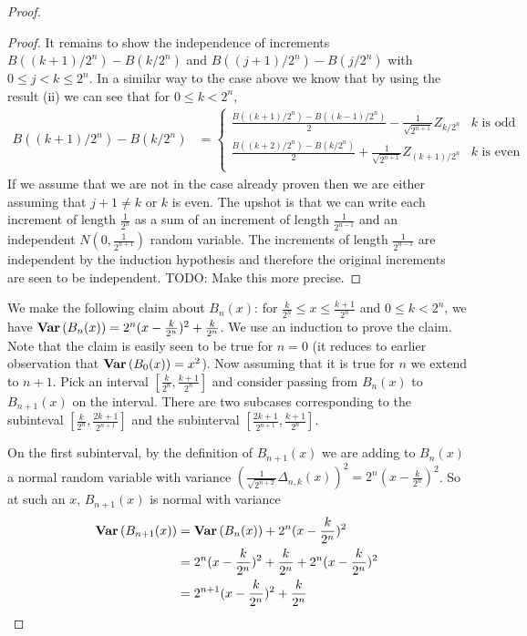 \begin{proof}
\begin{proof}
It remains to show the independence of increments 
$B((k+1)/2^n) - B(k/2^n)$ and $B((j+1)/2^n) - B(j/2^n)$ with $0 \leq j
< k \leq 2^n$.  In a similar way to the case above we know that
by using the result (ii) we can see that for $0 \leq k < 2^n$,
\begin{align*}
B((k+1)/2^n) - B(k/2^n) &= \begin{cases}
\frac{B((k+1)/2^n) - B((k-1)/2^n)}{2} - \frac{1}{\sqrt{2^{n+1}}}
Z_{k/2^n} & \text{$k$ is odd} \\
\frac{B((k+2)/2^n) - B(k/2^n)}{2} + \frac{1}{\sqrt{2^{n+1}}}
Z_{(k+1)/2^n} & \text{$k$ is even} \\
\end{cases}
\end{align*}
If we assume that we are not in the case already proven then we are either
assuming that $j+1 \neq k$ or $k$ is even. The upshot is that we can
write each increment of length $\frac{1}{2^n}$ as a sum of an increment of
length $\frac{1}{2^{n-1}}$ and an independent $N(0, \frac{1}{2^{n+1}})$
 random variable.  The increments of length $\frac{1}{2^{n-1}}$ are
 independent by the induction hypothesis and therefore the original
 increments are seen to be independent.  TODO: Make this more precise.
\end{proof}

We make the following claim about $B_n(x)$: for $\frac{k}{2^n}
\leq x \leq \frac{k+1}{2^n}$ and $0 \leq k < 2^n$, we have
$\textbf{Var} \left (B_n(x) \right ) = 2^n(x - \frac{k}{2^n})^2 + \frac{k}{2^n}$.  We
use an induction to prove the claim.  Note
that the claim is easily seen to be true for $n=0$ (it reduces to
earlier observation that $\textbf{Var} \left (B_0(x) \right ) = x^2$).  Now assuming that
it is true for $n$ we extend to $n+1$.  Pick an interval
$[\frac{k}{2^{n}}, \frac{k+1}{2^{n}}]$ and consider passing from
$B_n(x)$ to $B_{n+1}(x)$ on the interval.  There are two subcases
corresponding to the subinteval $[\frac{k}{2^{n}},
\frac{2k+1}{2^{n+1}}]$ and the subinterval $[\frac{2k+1}{2^{n+1}},
\frac{k+1}{2^{n}}]$.

On the first subinterval, by the definition of $B_{n+1}(x)$ we are
adding to $B_n(x)$ a normal random variable with variance
$\left ( \frac{1}{\sqrt{2^{n+2}}} \Delta_{n,k}(x) \right)^2 = 2^n(x-\frac{k}{2^n})^2$.  So at such an $x$, $B_{n+1}(x)$ is normal
with variance 
\begin{align*}
\textbf{Var} \left (B_{n+1}(x) \right ) &= \textbf{Var} \left (B_{n}(x) \right )  +
2^n(x-\frac{k}{2^n})^2  \\
&= 2^n(x-\frac{k}{2^n})^2 + \frac{k}{2^n} + 2^n(x-\frac{k}{2^n})^2 \\
&=
2^{n+1} (x-\frac{k}{2^n})^2 + \frac{k}{2^n}
\end{align*}


\end{proof}
